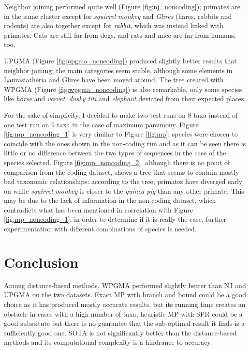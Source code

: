 \documentclass[11pt,twocolumn]{article}
\begin{document}
Neighbor joining performed quite well (Figure \ref{fig:nj_noncoding}); primates are in the same cluster except for \textit{squirrel monkey} and \textit{Glires} (hares, rabbits and rodents) are also together except for \textit{rabbit}, which was instead linked with primates. Cats are still far from dogs, and rats and mice are far from humans, too.

UPGMA (Figure \ref{fig:upgma_noncoding}) produced slightly better results that neighbor joining; the main categories seem stable, although some elements in Laurasiatheria and Glires have been moved around. The tree created with WPGMA (Figure \ref{fig:wpgma_noncoding}) is also remarkable, only some species like \textit{horse} and \textit{vervet}, \textit{dusky titi} and \textit{elephant} deviated from their expected places.

For the sake of simplicity, I decided to make two test runs on 8 taxa instead of one test run on 9 taxa in the case of maximum parsimony. Figure \ref{fig:mp_noncoding_1} is very similar to Figure \ref{fig:mp}; species were chosen to coincide with the ones shown in the non-coding run and as it can be seen there is little or no difference between the two types of sequences in the case of the species selected. Figure \ref{fig:mp_noncoding_2}, although there is no point of comparison from the coding dataset, shows a tree that seems to contain mostly bad taxonomic relationships: according to the tree, primates have diverged early on while \textit{squirrel monkey} is closer to the \textit{guinea pig} than any other primate. This may be due to the lack of information in the non-coding dataset, which contradicts what has been mentioned in correlation with Figure \ref{fig:mp_noncoding_1}; in order to determine if it is really the case, further experimentation with different combinations of species is needed.


\section{Conclusion}

Among distance-based methods, WPGMA performed slightly better than NJ and UPGMA on the two datasets. Exact MP with branch and bound could be a good choice as it has produced mostly accurate results, but its running time creates an obstacle in cases with a high number of taxa; heuristic MP with SPR could be a good substitute but there is no guarantee that the sub-optimal result it finds is a sufficiently good one. SOTA is not significantly better than the distance-based methods and its computational complexity is a hindrance to accuracy.
\end{document}
